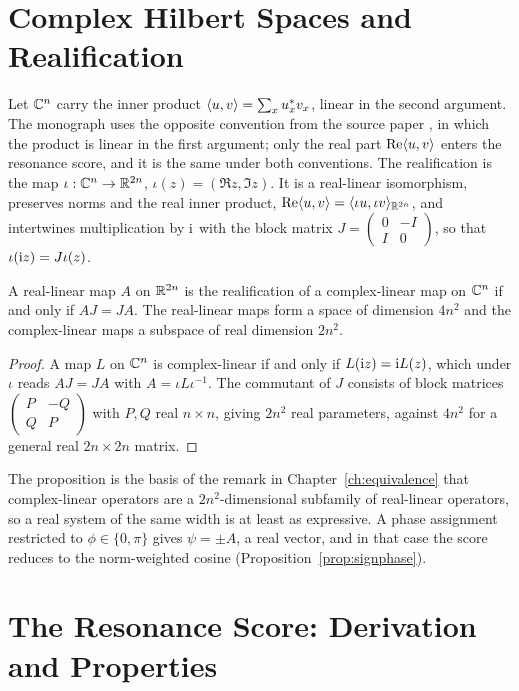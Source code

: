 \chapter{Complex Hilbert Spaces and Realification}\label{app:complex}

Let $\mathbb{C}^n$ carry the inner product $\langle u,v\rangle=\sum_xu_x^*v_x$, linear in the second argument. The monograph uses the opposite convention from the source paper \cite{listopad2025}, in which the product is linear in the first argument; only the real part $\operatorname{Re}\langle u,v\rangle$ enters the resonance score, and it is the same under both conventions. The realification is the map $\iota:\mathbb{C}^n\to\mathbb{R}^{2n}$, $\iota(z)=(\Re z,\Im z)$. It is a real-linear isomorphism, preserves norms and the real inner product, $\operatorname{Re}\langle u,v\rangle=\langle \iota u,\iota v\rangle_{\mathbb{R}^{2n}}$, and intertwines multiplication by $\mathrm{i}$ with the block matrix $J=\begin{pmatrix}0&-I\\ I&0\end{pmatrix}$, so that $\iota(\mathrm{i} z)=J\iota(z)$.

\begin{proposition}\label{prop:A1}
A real-linear map $A$ on $\mathbb{R}^{2n}$ is the realification of a complex-linear map on $\mathbb{C}^n$ if and only if $AJ=JA$. The real-linear maps form a space of dimension $4n^2$ and the complex-linear maps a subspace of real dimension $2n^2$.
\end{proposition}

\begin{proof}
A map $L$ on $\mathbb{C}^n$ is complex-linear if and only if $L(\mathrm{i} z)=\mathrm{i} L(z)$, which under $\iota$ reads $AJ=JA$ with $A=\iota L\iota^{-1}$. The commutant of $J$ consists of block matrices $\begin{pmatrix}P&-Q\\Q&P\end{pmatrix}$ with $P,Q$ real $n\times n$, giving $2n^2$ real parameters, against $4n^2$ for a general real $2n\times2n$ matrix.
\end{proof}

The proposition is the basis of the remark in Chapter~\ref{ch:equivalence} that complex-linear operators are a $2n^2$-dimensional subfamily of real-linear operators, so a real system of the same width is at least as expressive. A phase assignment restricted to $\phi\in\{0,\pi\}$ gives $\psi=\pm A$, a real vector, and in that case the score reduces to the norm-weighted cosine (Proposition~\ref{prop:signphase}).

\chapter{The Resonance Score: Derivation and Properties}\label{app:score}

